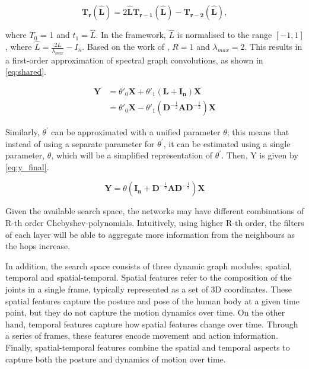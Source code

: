 \begin{equation}
    \bm{T_r}(\bm{\hat{L}}) = 2 \bm{\hat{L}}\bm{T_{r-1}} (\bm{\hat{L}}) - \bm{T_{r-2}}(\bm{\hat{L}}),
    \label{eq:cheb}
\end{equation}

where $T_0$ = 1 and $t_1 = \hat{L}$. In the framework, $\hat{L}$ is normalised to the range $[-1,1]$, where $\hat{L} = \frac{2L}{\lambda_{max}} - I_n$. Based on the work of \autocite{DBLP:journals/corr/KipfW16}, $R = 1$ and $\lambda_{max} = 2$. This results in a first-order approximation of spectral graph convolutions, as shown in \cref{eq:shared}. 


\begin{equation}
\begin{aligned}
    \bm{Y} &= \theta'_0 \bm{X} + \theta'_1 (\bm{L} + \bm{I_n})\bm{X} \\
    &= \theta'_0 \bm{X} - \theta'_1(\bm{D}^{-\frac{1}{2}}\bm{A}\bm{D}^{-\frac{1}{2}})\bm{X}
\end{aligned}
\label{eq:shared}
\end{equation}

Similarly, $\theta^{'}$ can be approximated with a unified parameter $\theta$; this means that instead of using a separate parameter for $\theta^{'}$, it can be estimated using a single parameter, $\theta$, which will be a simplified representation of $\theta^{'}$. Then, Y is given by \cref{eq:y_final}. 

\begin{equation*}
\bm{Y} = \theta (\bm{I_n} + \bm{D}^{-\frac{1}{2}}\bm{A}\bm{D}^{-\frac{1}{2}})\bm{X}
\label{eq:y_final}
\end{equation*}

Given the available search space, the networks may have different combinations of R-th order Chebyshev-polynomials. Intuitively, using higher R-th order, the filters of each layer will be able to aggregate more information from the neighbours as the hops increase. 

In addition, the search space consists of three dynamic graph modules; spatial, temporal and spatial-temporal. Spatial features refer to the composition of the joints in a single frame, typically represented as a set of 3D coordinates. These spatial features capture the posture and pose of the human body at a given time point, but they do not capture the motion dynamics over time. On the other hand, temporal features capture how spatial features change over time. Through a series of frames, these features encode movement and action information. Finally, spatial-temporal features combine the spatial and temporal aspects to capture both the posture and dynamics of motion over time.  

